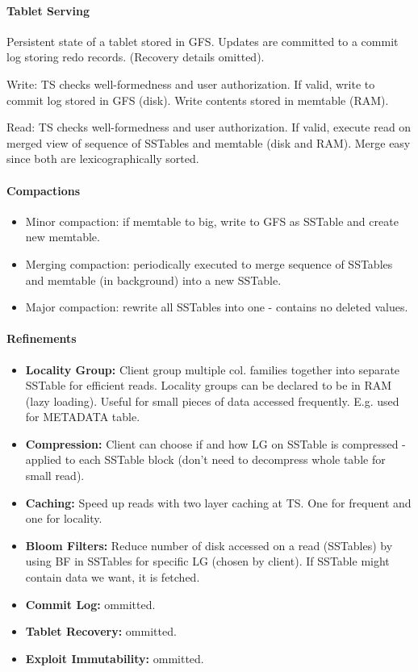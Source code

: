 \paragraph{Tablet Serving}
Persistent state of a tablet stored in GFS. Updates are committed to a commit log storing redo records. (Recovery details omitted).

Write: TS checks well-formedness and user authorization. If valid, write to commit log stored in GFS (disk). Write contents stored in memtable (RAM).

Read: TS checks well-formedness and user authorization. If valid, execute read on merged view of sequence of SSTables and memtable (disk and RAM). Merge easy since both are lexicographically sorted.

\paragraph{Compactions}
\begin{itemize}
    \item Minor compaction: if memtable to big, write to GFS as SSTable and create new memtable.
    \item Merging compaction: periodically executed to merge sequence of SSTables and memtable (in background) into a new SSTable.
    \item Major compaction: rewrite all SSTables into one - contains no deleted values.
\end{itemize}


\paragraph{Refinements}
\begin{itemize}
    \item \textbf{Locality Group:} Client group multiple col. families together into separate SSTable for efficient reads. Locality groups can be declared to be in RAM (lazy loading). Useful for small pieces of data accessed frequently. E.g. used for METADATA table.
    \item \textbf{Compression:} Client can choose if and how LG on SSTable is compressed - applied to each SSTable block (don't need to decompress whole table for small read).
    \item \textbf{Caching:} Speed up reads with two layer caching at TS. One for frequent and one for locality.
    \item \textbf{Bloom Filters:} Reduce number of disk accessed on a read (SSTables) by using BF in SSTables for specific LG (chosen by client). If SSTable might contain data we want, it is fetched.
    \item \textbf{Commit Log:} ommitted.
    \item \textbf{Tablet Recovery:} ommitted.
    \item \textbf{Exploit Immutability:} ommitted.
\end{itemize}

